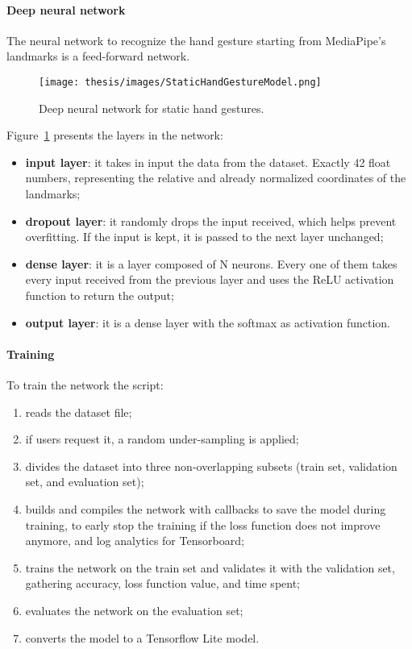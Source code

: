 \documentclass[../thesis.tex]{subfiles}
\begin{document}
\paragraph{Deep neural network}\label{p:static_hand_gesture_deep_neural_network}
The neural network to recognize the hand gesture starting from MediaPipe's landmarks is a feed-forward network.
\begin{figure}[H]
    \centering
    \texttt{[image: thesis/images/StaticHandGestureModel.png]}
    \caption{Deep neural network for static hand gestures.}
    \label{fig:static_hand_gesture_model}
\end{figure}
Figure~\ref{fig:static_hand_gesture_model} presents the layers in the network:
\begin{itemize}
    \item \textbf{input layer}: it takes in input the data from the dataset. Exactly 42 float numbers, representing the relative and already normalized coordinates of the landmarks; 
    \item \textbf{dropout layer}: it randomly drops the input received, which helps prevent overfitting. If the input is kept, it is passed to the next layer unchanged; 
    \item \textbf{dense layer}: it is a layer composed of N neurons. Every one of them takes every input received from the previous layer and uses the ReLU activation function to return the output;
    \item \textbf{output layer}: it is a dense layer with the softmax as activation function.
\end{itemize}

\paragraph{Training}\label{p:static_hand_gesture_training}
To train the network the script:
\begin{enumerate}
    \item reads the dataset file;
    \item if users request it, a random under-sampling is applied;
    \item divides the dataset into three non-overlapping subsets (train set, validation set, and evaluation set);
    \item builds and compiles the network with callbacks to save the model during training, to early stop the training if the loss function does not improve anymore, and log analytics for Tensorboard; 
    \item trains the network on the train set and validates it with the validation set, gathering accuracy, loss function value, and time spent;
    \item evaluates the network on the evaluation set;
    \item converts the model to a Tensorflow Lite model.
\end{enumerate}
\end{document}
